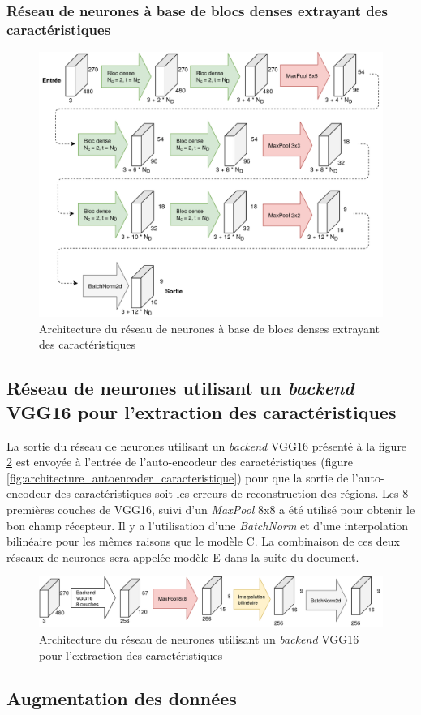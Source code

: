\subsubsection{Réseau de neurones à base de blocs denses extrayant des caractéristiques}
    \begin{figure}[H]
        \centering
        \includegraphics[width=17cm]{images/Architecture_SmallCnnWithAutoencoderDenseBlocks.png}
        \caption{Architecture du réseau de neurones à base de blocs denses extrayant des caractéristiques}
        \label{fig:architecture_small_cnn_dense_bloc}
    \end{figure}

\subsection{Réseau de neurones utilisant un \textit{backend} VGG16 pour l'extraction des caractéristiques}
    La sortie du réseau de neurones utilisant un \textit{backend} VGG16 présenté à la figure \ref{fig:architecture_vgg16} est envoyée à l'entrée de l'auto-encodeur des caractéristiques (figure \ref{fig:architecture_autoencoder_caracteristique}) pour que la sortie de l'auto-encodeur des caractéristiques soit les erreurs de reconstruction des régions. Les 8 premières couches de VGG16, suivi d'un \textit{MaxPool} 8x8 a été utilisé pour obtenir le bon champ récepteur. Il y a l'utilisation d'une \textit{BatchNorm} et d'une interpolation bilinéaire pour les mêmes raisons que le modèle C. La combinaison de ces deux réseaux de neurones sera appelée modèle E dans la suite du document.
    \begin{figure}[H]
        \centering
        \includegraphics[width=15cm]{images/Architecture_Vgg16BackendAutoencoder.png}
        \caption{Architecture du réseau de neurones utilisant un \textit{backend} VGG16 pour l'extraction des caractéristiques}
        \label{fig:architecture_vgg16}
    \end{figure}

\subsection{Augmentation des données}
    